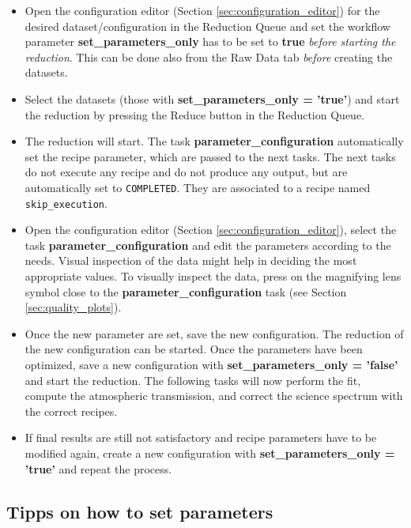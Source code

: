 \begin{itemize}

\item Open the configuration editor (Section
  \ref{sec:configuration_editor}) for the desired
  dataset/configuration in the Reduction Queue and set the workflow
  parameter {\bf set\_parameters\_only} has to be set to {\bf true} {\it
    before starting the reduction}. This can be done also from the Raw
  Data tab {\it before} creating the datasets.

\item Select the datasets (those with {\bf
  set\_parameters\_only = 'true'}) and start the reduction by pressing
  the Reduce button in the Reduction Queue.

\item The reduction will start. The task {\bf
  parameter\_configuration} automatically set the recipe parameter,
  which are passed to the next tasks. The next tasks do not execute
  any recipe and do not produce any output, but are automatically set
  to {\tt COMPLETED}. They are associated to a recipe named {\tt
    skip\_execution}.

\item Open the configuration editor (Section
  \ref{sec:configuration_editor}), select the task {\bf
    parameter\_configuration} and edit the parameters according to the
  needs. Visual inspection of the data might help in deciding the
  most appropriate values. To visually inspect the data, press on
  the magnifying lens symbol close to the {\bf parameter\_configuration}
  task (see Section \ref{sec:quality_plots}).


\item Once the new parameter are set, save the new configuration. The
  reduction of the new configuration can be started. Once the
  parameters have been optimized, save a new configuration with {\bf
    set\_parameters\_only = 'false'} and start the reduction.  The
  following tasks will now perform the fit, compute the atmospheric
  transmission, and correct the science spectrum with the correct
  recipes.

\item If final results are still not satisfactory and recipe
  parameters have to be modified again, create a new configuration
  with {\bf set\_parameters\_only = 'true'} and repeat the process.


\end{itemize}

\subsection{Tipps on how to set parameters}

